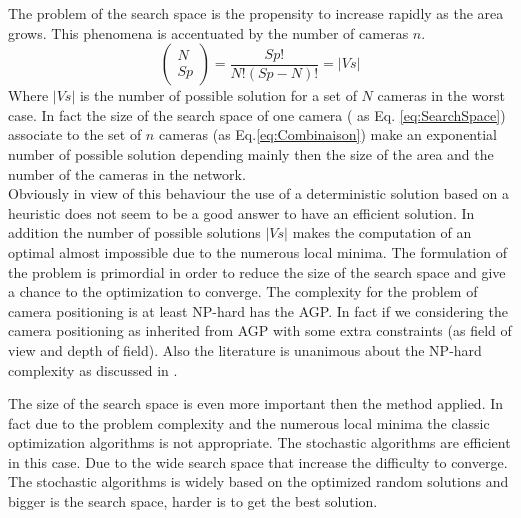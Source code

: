 The problem of the search space is the propensity to increase rapidly as the area grows. This phenomena is accentuated by the number of cameras $n$.
 \begin{equation} \label{eq:Combinaison}
 \begin{pmatrix} N \\ Sp \end{pmatrix}  = \frac{Sp!}{N!(Sp-N)!} = |Vs|
 \end{equation} 
 Where $|Vs|$ is the number of possible solution for a set of $N$ cameras in the worst case. %
 In fact the size of the search space of one camera ( as Eq. \ref{eq:SearchSpace}) associate to the set of $n$ cameras (as Eq.\ref{eq:Combinaison}) make an exponential number of possible solution depending mainly then the size of the area and the number of the cameras in the network. \\
 Obviously in view of this behaviour the use of a deterministic solution based on a heuristic does not seem to be a good answer to have an efficient solution. In addition the number of possible solutions $|Vs|$ makes the computation of an optimal almost impossible due to the numerous local minima. 
 The formulation of the problem is primordial in order to reduce the size of the search space and give a chance to the optimization to converge.
 The complexity for the problem of camera positioning is  at least  NP-hard has  the AGP. In fact if we considering the  camera positioning  as inherited  from AGP  with some extra constraints (as field of view and depth of field). Also the literature is unanimous about the  NP-hard complexity as discussed in  \citep{43*erdem2006,53*packer2008,62*vijayan1991,22*zhao2008,49*ning1994}. %

The size of the search space is even more important then the method applied. In fact due to the  problem complexity   and  the numerous local minima the classic optimization algorithms  is not  appropriate. The stochastic algorithms  are efficient in this case.  Due to the wide  search space that increase the difficulty to converge. The stochastic algorithms is  widely based on the optimized random solutions and bigger is the  search space,  harder is to get the best solution. 






 
